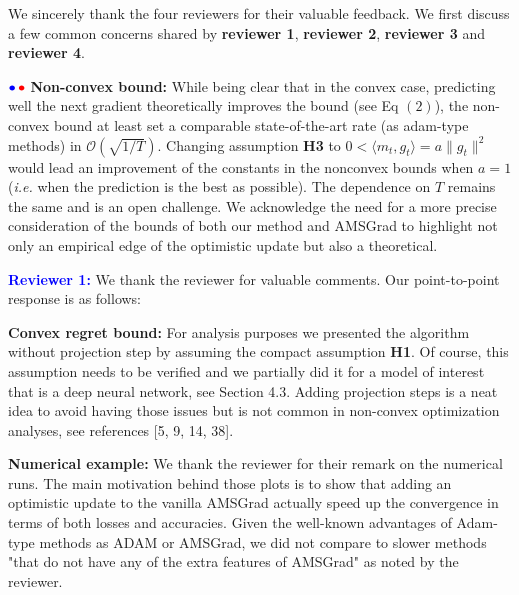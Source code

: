 \documentclass{article}
\begin{document}
We sincerely thank the four reviewers for their valuable feedback. 
We first discuss a few common concerns shared by \textbf{\color{blue}reviewer 1}, \textbf{\color{red} reviewer 2}, \textbf{\color{green!50!black}reviewer 3} and \textbf{\color{purple}reviewer 4}. \vspace{-5pt}

${\color{blue}\bullet}\!~{\color{red}\bullet}$ \textbf{Non-convex bound:} 
While being clear that in the convex case, predicting well the next gradient theoretically improves the bound (see Eq $(2)$), the non-convex bound at least set a comparable state-of-the-art rate (as adam-type methods) in $\mathcal{O}( \sqrt{1/T} )$.
Changing assumption \textbf{H3} to $0 < \langle m_t, g_t \rangle  = a \|g_t\|^2$ would lead an improvement of the constants in the nonconvex bounds when $a=1$ (\textit{i.e.} when the prediction is the best as possible). The dependence on $T$ remains the same and is an open challenge.
We acknowledge the need for a more precise consideration of the bounds of both our method and AMSGrad to highlight not only an empirical edge of the optimistic update but also a theoretical. \vspace{-5pt}


\textbf{\textcolor{blue}{Reviewer 1:}} We thank the reviewer for valuable comments. Our point-to-point response is as follows:\vspace{-5pt}


\textbf{Convex regret bound:} 
For analysis purposes we presented the algorithm without projection step by assuming the compact assumption \textbf{H1}.
Of course, this assumption needs to be verified and we partially did it for a model of interest that is a deep neural network, see Section 4.3.
Adding projection steps is a neat idea to avoid having those issues but is not common in non-convex optimization analyses, see references [5, 9, 14, 38].\vspace{-5pt}

\textbf{Numerical example:} We thank the reviewer for their remark on the numerical runs. 
The main motivation behind those plots is to show that adding an optimistic update to the vanilla AMSGrad actually speed up the convergence in terms of both losses and accuracies.
Given the well-known advantages of Adam-type methods as ADAM or AMSGrad, we did not compare to slower methods "that do not have any of the extra features of AMSGrad" as noted by the reviewer.\vspace{-5pt}
\end{document}
